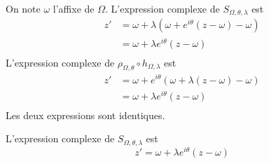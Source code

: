 \begin{prv}
	On note $\omega$ l'affixe de $\Omega$.
	L'expression complexe de $S_{\Omega, \theta, \lambda}$ est
	\begin{align*}
		z' &= \omega + \lambda(\omega + e^{i\theta}(z-\omega) - \omega)\\
		&= \omega + \lambda e^{i\theta}(z-\omega) \\
	\end{align*}
	L'expression complexe de $\rho_{\Omega, \theta} \circ h_{\Omega, \lambda}$ est
	\begin{align*}
		z' &= \omega + e^{i\theta}(\omega+\lambda(z-\omega) -\omega)\\
		&= \omega + \lambda e^{i\theta}(z-\omega) \\
	\end{align*}
	Les deux expressions sont identiques.
\end{prv}

\begin{prop}
	L'expression complexe de $S_{\Omega,\theta,\lambda}$ est \[
		z' = \omega + \lambda e^{i\theta}(z-\omega)
	\] 
\end{prop}
